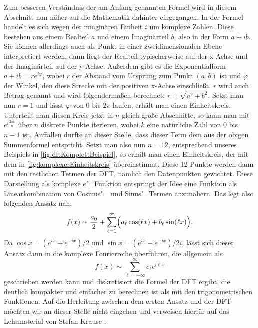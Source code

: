 Zum besseren Verständnis der am Anfang genannten Formel wird in diesem Abschnitt nun näher auf die Mathematik dahinter eingegangen. In der Formel handelt es sich wegen der imaginären Einheit $i$ um komplexe Zahlen. Diese bestehen aus einem Realteil $a$ und einem Imaginärteil $b$, also in der Form $a + ib$. Sie können allerdings auch als Punkt in einer zweidimensionalen Ebene interpretiert werden, dann liegt der Realteil typischerweise auf der x-Achse und der Imaginärteil auf der y-Achse. Außerdem gibt es die Exponentialform $a+ib=re^{i\varphi}$, wobei $r$ der Abstand vom Ursprung zum Punkt $(a,b)$ ist und $\varphi$ der Winkel, den diese Strecke mit der positiven x-Achse einschließt. $r$ wird auch Betrag genannt und wird folgendermaßen berechnet: $r=\sqrt{a^2+b^2}$. Setzt man nun $r=1$ und lässt $\varphi$ von 0 bis $2\pi$ laufen, erhält man einen Einheitskreis. Unterteilt man diesen Kreis jetzt in $n$ gleich große Abschnitte, so kann man mit $e^{i\frac{2\pi k}{n}}$ über $n$ diskrete Punkte iterieren, wobei $k$ eine natürliche Zahl von 0 bis $n-1$ ist. Auffallen dürfte an dieser Stelle, dass dieser Term dem aus der obigen Summenformel entspricht. Setzt man also nun $n=12$, entsprechend unseres Beispiels in \autoref{fig:dftKomplettBeispiel}, so erhält man einen Einheitskreis, der mit dem in \autoref{fig:komplexerEinheitskreis} übereinstimmt. Diese 12 Punkte werden dann mit den restlichen Termen der \acs{DFT}, nämlich den Datenpunkten gewichtet. Diese Darstellung als komplexe $e$"=Funktion entspringt der Idee eine Funktion als Linearkombination von Cosinus"= und Sinus"=Termen anzunähern. Das legt also folgenden Ansatz nah: \[f(x)\sim\frac{a_0}{2}+\sum_{\ell=1}^{\infty}\Bigl(a_\ell\cos(\ell x)+b_\ell\sin(\ell x)\Bigr).\] Da $\cos x = (e^{ix}+e^{-ix})/2 \text{ und } \sin x = (e^{ix}-e^{-ix})/2i$, lässt sich dieser Ansatz dann in die komplexe Fourierreihe überführen, die allgemein als \[f(x) \sim \sum_{\ell = -\infty}^\infty c_\ell e^{i\ell x}\] geschrieben werden kann und diskretisiert die Formel der \acs{DFT} ergibt, die deutlich kompakter und einfacher zu berechnen ist als mit den trigonometrischen Funktionen. Auf die Herleitung zwischen dem ersten Ansatz und der \acs{DFT} möchten wir an dieser Stelle nicht eingehen und verweisen hierfür auf das Lehrmaterial von Stefan Krause \cite{fourierundwavelet}.

